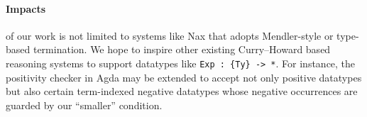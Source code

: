 \documentclass[a4paper]{easychair} %
\begin{document}
\paragraph{Impacts\!\!} of our work is not limited to
systems like Nax that adopts Mendler-style or type-based termination.
We hope to inspire other existing Curry--Howard based reasoning systems
to support datatypes like \texttt{Exp\,:\,\{Ty\}\,->\,*}.
For instance, the positivity checker in Agda may be extended to accept
not only positive datatypes but also certain term-indexed negative datatypes
whose negative occurrences are guarded by our ``smaller'' condition.

\end{document}
